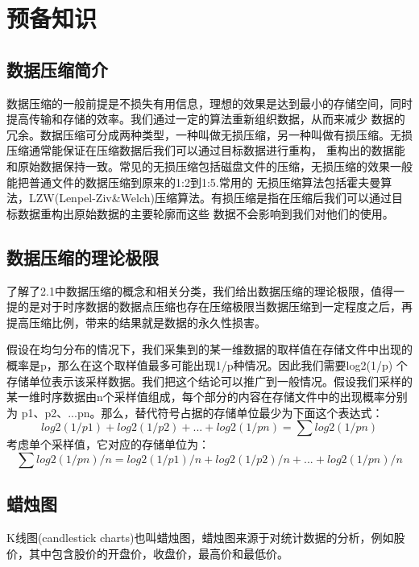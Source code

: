 
\chapter{预备知识}
\label{Chapter 2}

\section{数据压缩简介}
\label{Section 2.1}


数据压缩的一般前提是不损失有用信息，理想的效果是达到最小的存储空间，同时提高传输和存储的效率。我们通过一定的算法重新组织数据，从而来减少
数据的冗余。数据压缩可分成两种类型，一种叫做无损压缩，另一种叫做有损压缩。无损压缩通常能保证在压缩数据后我们可以通过目标数据进行重构，
重构出的数据能和原始数据保持一致。常见的无损压缩包括磁盘文件的压缩，无损压缩的效果一般能把普通文件的数据压缩到原来的1:2到1:5.常用的
无损压缩算法包括霍夫曼算法，LZW(Lenpel-Ziv\&Welch)压缩算法。有损压缩是指在压缩后我们可以通过目标数据重构出原始数据的主要轮廓而这些
数据不会影响到我们对他们的使用。


\section{数据压缩的理论极限}
\label{Section 2.2}

了解了2.1中数据压缩的概念和相关分类，我们给出数据压缩的理论极限，值得一提的是对于时序数据的数据点压缩也存在压缩极限当数据压缩到一定程度之后，再提高压缩比例，带来的结果就是数据的永久性损害。

假设在均匀分布的情况下，我们采集到的某一维数据的取样值在存储文件中出现的概率是p，那么在这个取样值最多可能出现1/p种情况。因此我们需要log2(1/p)
个存储单位表示该采样数据。我们把这个结论可以推广到一般情况。假设我们采样的某一维时序数据由n个采样值组成，每个部分的内容在存储文件中的出现概率分别为
p1、p2、...pn。那么，替代符号占据的存储单位最少为下面这个表达式：
\begin{equation}
log2(1/p1) + log2(1/p2) + ... + log2(1/pn)= ∑ log2(1/pn)
\end{equation}
考虑单个采样值，它对应的存储单位为：
\begin{equation}
∑ log2(1/pn) / n= log2(1/p1)/n + log2(1/p2)/n + ... + log2(1/pn)/n
\end{equation}


\section{蜡烛图}
\label{Section 2.3}
K线图(candlestick charts)也叫蜡烛图，蜡烛图来源于对统计数据的分析，例如股价，其中包含股价的开盘价，收盘价，最高价和最低价。

